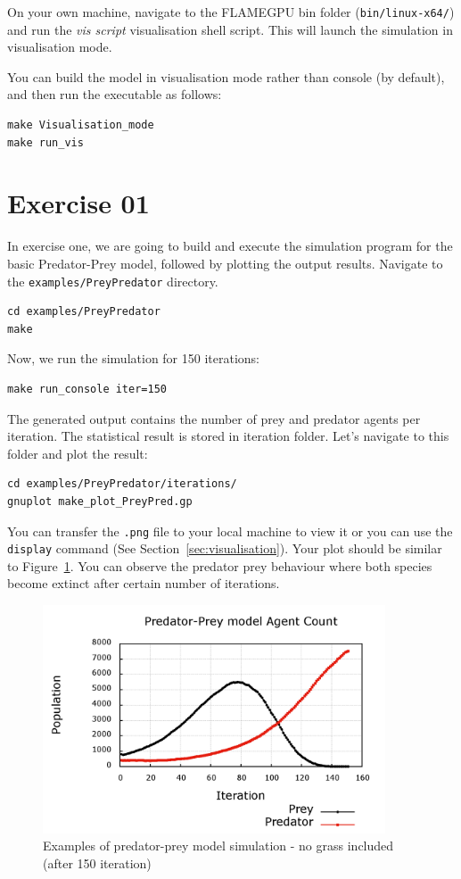 On your own machine, navigate to the FLAMEGPU bin folder (\verb|bin/linux-x64/|) and run the \textit{vis script} visualisation shell script. This will launch the simulation in visualisation mode. 

You can build the model in visualisation mode rather than console (by default), and then run the executable as follows:

\begin{verbatim}
make Visualisation_mode
make run_vis
\end{verbatim}


\section{Exercise 01}
In exercise one, we are going to build and execute the simulation program for the basic Predator-Prey model, followed by plotting the output results. Navigate to the \verb|examples/PreyPredator| directory.

\begin{verbatim}
cd examples/PreyPredator
make
\end{verbatim}

Now, we run the simulation for 150 iterations:
\begin{verbatim}
make run_console iter=150
\end{verbatim}

The generated output contains the number of prey and predator agents per iteration. The statistical result is stored in iteration folder. Let's navigate to this folder and plot the result:

\begin{verbatim}
cd examples/PreyPredator/iterations/
gnuplot make_plot_PreyPred.gp
\end{verbatim}

You can transfer the \verb|.png| file to your local machine to view it or you can use the \verb|display| command (See Section~\ref{sec:visualisation}). Your plot should be similar to Figure~\ref{fig:simulation_noGrass}. You can observe the predator prey behaviour where both species become extinct after certain number of iterations.


\begin{figure}[!h] 
    \centering
    \includegraphics[width=4in]{prey_predator_iter150}
    \caption{Examples of predator-prey model simulation - no grass included (after 150 iteration) }
    \label{fig:simulation_noGrass}
\end{figure}


